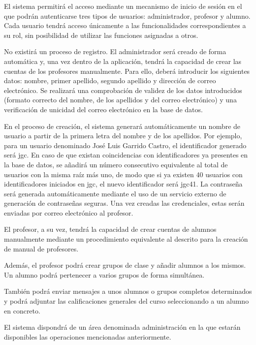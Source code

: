 El sistema permitirá el acceso mediante un mecanismo de inicio de sesión en el que podrán autenticarse tres tipos de usuarios: administrador, profesor y alumno. Cada usuario tendrá acceso únicamente a las funcionalidades correspondientes a su rol, sin posibilidad de utilizar las funciones asignadas a otros.

No existirá un proceso de registro. El administrador será creado de forma automática y, una vez dentro de la aplicación, tendrá la capacidad de crear las cuentas de los profesores manualmente. Para ello, deberá introducir los siguientes datos: nombre, primer apellido, segundo apellido y dirección de correo electrónico. Se realizará una comprobación de validez de los datos introducidos (formato correcto del nombre, de los apellidos y del correo electrónico) y una verificación de unicidad del correo electrónico en la base de datos.

En el proceso de creación, el sistema generará automáticamente un nombre de usuario a partir de la primera letra del nombre y de los apellidos. Por ejemplo, para un usuario denominado José Luis Garrido Castro, el identificador generado será jgc. En caso de que existan coincidencias con identificadores ya presentes en la base de datos, se añadirá un número consecutivo equivalente al total de usuarios con la misma raíz más uno, de modo que si ya existen 40 usuarios con identificadores iniciados en jgc, el nuevo identificador será jgc41. La contraseña será generada automáticamente mediante el uso de un servicio externo de generación de contraseñas seguras. Una vez creadas las credenciales, estas serán enviadas por correo electrónico al profesor.

El profesor, a su vez, tendrá la capacidad de crear cuentas de alumnos manualmente mediante un procedimiento equivalente al descrito para la creación de manual de profesores.

Además, el profesor podrá crear grupos de clase y añadir alumnos a los mismos. Un alumno podrá pertenecer a varios grupos de forma simultánea.

También podrá enviar mensajes a unos alumnos o grupos completos determinados y podrá adjuntar las calificaciones generales del curso seleccionando a un alumno en concreto.

El sistema dispondrá de un área denominada administración en la que estarán disponibles las operaciones mencionadas anteriormente.

